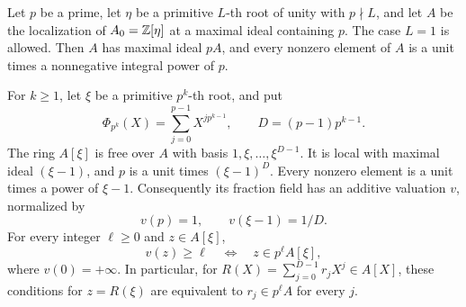 \begin{lemma}\label{lem:local-ring}
Let \(p\) be a prime, let \(\eta\) be a primitive \(L\)-th root of unity
with \(p\nmid L\), and let \(A\) be the localization of
\(A_0=\mathbb Z[\eta]\) at a maximal ideal containing \(p\). The case \(L=1\)
is allowed. Then \(A\) has maximal ideal \(pA\), and every nonzero
element of \(A\) is a unit times a nonnegative integral power of \(p\).

For \(k\geq1\), let \(\xi\) be a primitive \(p^k\)-th root, and put
\[
 \Phi_{p^k}(X)=\sum_{j=0}^{p-1}X^{jp^{k-1}},
 \qquad D=(p-1)p^{k-1}.
\]
The ring \(A[\xi]\) is free over \(A\) with basis
\(1,\xi,\ldots,\xi^{D-1}\). It is local with maximal ideal
\((\xi-1)\), and \(p\) is a unit times \((\xi-1)^D\).
Every nonzero element is a unit times a power of \(\xi-1\).
Consequently its fraction field has an additive valuation \(v\),
normalized by
\[
 v(p)=1,\qquad v(\xi-1)=1/D.
\]
For every integer \(\ell\geq0\) and \(z\in A[\xi]\),
\begin{equation}\label{eq:valuation-ideal}
 v(z)\geq\ell\quad\Longleftrightarrow\quad z\in p^\ell A[\xi],
\end{equation}
where \(v(0)=+\infty\). In particular, for
\(R(X)=\sum_{j=0}^{D-1}r_jX^j\in A[X]\), these conditions for
\(z=R(\xi)\) are equivalent to \(r_j\in p^\ell A\) for every \(j\).
\end{lemma}


